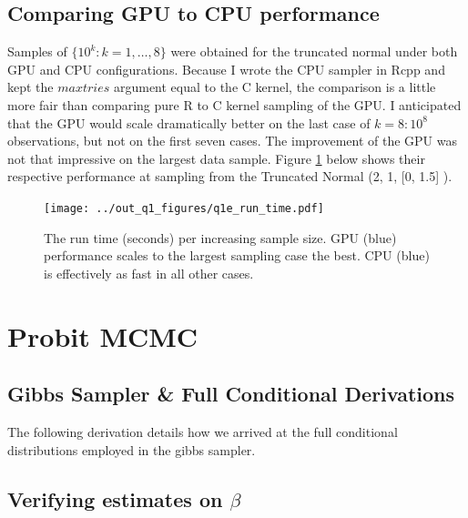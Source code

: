 \documentclass[9pt]{amsart}
\begin{document}
\newpage

\subsection{Comparing GPU to CPU performance}

Samples of $\{10^k: k = 1, \dots, 8\}$ were obtained for the truncated normal under both GPU and CPU configurations. Because I wrote the CPU sampler in Rcpp and kept the $maxtries$ argument equal to the C kernel, the comparison is a little more fair than comparing pure R  to C kernel sampling of the GPU. I anticipated that the GPU would scale dramatically better on the last case of $k = 8: 10^8$ observations, but not on the first seven cases.  The improvement of the GPU was not that impressive on the largest data sample.  Figure \ref{fig:scaling} below shows their respective performance at sampling from the Truncated Normal \Big (2, 1, [0, 1.5] \Big ). 

\begin{figure}[htbp] %
   \centering
   \texttt{[image: ../out\_q1\_figures/q1e\_run\_time.pdf]} 
   \caption{The run time (seconds) per increasing sample size. GPU (blue) performance scales to the largest sampling case the best. CPU (blue) is effectively as fast in all other cases.}
   \label{fig:scaling}
\end{figure}

\section{Probit MCMC}

\subsection{Gibbs Sampler \& Full Conditional Derivations}

The following derivation details how we arrived at the full conditional distributions employed in the gibbs sampler. 



\subsection{Verifying estimates on $\beta$}
\end{document}
